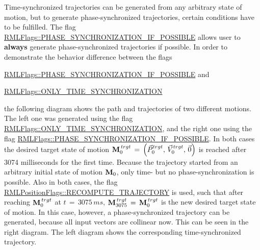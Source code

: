 Time-\/synchronized trajectories can be generated from any arbitrary state of motion, but to generate phase-\/synchronized trajectories, certain conditions have to be fulfilled. The flag {\ttfamily \mbox{\hyperlink{classRMLFlags_ac81441080dcaa610ff37c395ffc0bd5ea9f1e40a21dd62dbfb2413ef1d429547d}{R\+M\+L\+Flags\+::\+P\+H\+A\+S\+E\+\_\+\+S\+Y\+N\+C\+H\+R\+O\+N\+I\+Z\+A\+T\+I\+O\+N\+\_\+\+I\+F\+\_\+\+P\+O\+S\+S\+I\+B\+LE}}} allows user to {\bfseries{always}} generate phase-\/synchronized trajectories if possible. In order to demonstrate the behavior difference between the flags


\begin{DoxyItemize}
\item {\ttfamily \mbox{\hyperlink{classRMLFlags_ac81441080dcaa610ff37c395ffc0bd5ea9f1e40a21dd62dbfb2413ef1d429547d}{R\+M\+L\+Flags\+::\+P\+H\+A\+S\+E\+\_\+\+S\+Y\+N\+C\+H\+R\+O\+N\+I\+Z\+A\+T\+I\+O\+N\+\_\+\+I\+F\+\_\+\+P\+O\+S\+S\+I\+B\+LE}}} and
\item {\ttfamily \mbox{\hyperlink{classRMLFlags_ac81441080dcaa610ff37c395ffc0bd5eac7ecf60f6d53a74ec2e1b51903b7907b}{R\+M\+L\+Flags\+::\+O\+N\+L\+Y\+\_\+\+T\+I\+M\+E\+\_\+\+S\+Y\+N\+C\+H\+R\+O\+N\+I\+Z\+A\+T\+I\+ON}}}
\end{DoxyItemize}

the following diagram shows the path and trajectories of two different motions. The left one was generated using the flag {\ttfamily \mbox{\hyperlink{classRMLFlags_ac81441080dcaa610ff37c395ffc0bd5eac7ecf60f6d53a74ec2e1b51903b7907b}{R\+M\+L\+Flags\+::\+O\+N\+L\+Y\+\_\+\+T\+I\+M\+E\+\_\+\+S\+Y\+N\+C\+H\+R\+O\+N\+I\+Z\+A\+T\+I\+ON}}}, and the right one using the flag {\ttfamily \mbox{\hyperlink{classRMLFlags_ac81441080dcaa610ff37c395ffc0bd5ea9f1e40a21dd62dbfb2413ef1d429547d}{R\+M\+L\+Flags\+::\+P\+H\+A\+S\+E\+\_\+\+S\+Y\+N\+C\+H\+R\+O\+N\+I\+Z\+A\+T\+I\+O\+N\+\_\+\+I\+F\+\_\+\+P\+O\+S\+S\+I\+B\+LE}}}. In both cases the desired target state of motion ${\bf M}_0^{\,trgt}\,=\,\left(\vec{P}_{0}^{trgt},\,\vec{V}_{0}^{trgt},\,\vec{0}\right)$ is reached after 3074 milliseconds for the first time. Because the trajectory started from an arbitrary initial state of motion ${\bf M}_0 $, only time-\/ but no phase-\/synchronization is possible. Also in both cases, the flag {\ttfamily \mbox{\hyperlink{classRMLPositionFlags_a0cf5bb7ba9fb4d9ab8040b0546170761a1aef826d31747b8d4e1f89c024fb36ae}{R\+M\+L\+Position\+Flags\+::\+R\+E\+C\+O\+M\+P\+U\+T\+E\+\_\+\+T\+R\+A\+J\+E\+C\+T\+O\+RY}}} is used, such that after reaching ${\bf M}_0^{\,trgt} $ at $t\,=\,3075\,ms$, ${\bf M}_{3075}^{\,trgt}\,=\,{\bf M}_0^{\,trgt}$ is the new desired target state of motion. In this case, however, a phase-\/synchronized trajectory can be generated, because all input vectors are collinear now. This can be seen in the right diagram. The left diagram shows the corresponding time-\/synchronized trajectory.

